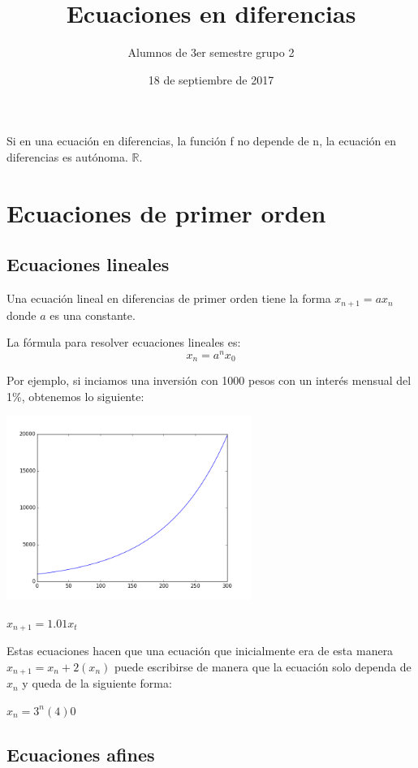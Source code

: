 \documentclass{article}
\title{Ecuaciones en diferencias}
\author{Alumnos de 3er semestre grupo 2}
\date{18 de septiembre de 2017}
\begin{document}
\maketitle

Si en una ecuación en diferencias, la función f no depende de n, la ecuación en diferencias es autónoma. $\mathbb{R}$.

\section{Ecuaciones de primer orden}

\subsection{Ecuaciones lineales}

Una ecuación lineal en diferencias de primer orden tiene la forma $x_{n+1}=ax_n$ donde $a$ es una constante. 

La fórmula para resolver ecuaciones lineales es:
\begin{equation}
  \label{lineal}
  x_n=a^nx_0
\end{equation}

Por ejemplo, si inciamos una inversión con 1000 pesos con un interés mensual del 1\%, obtenemos lo siguiente:

\begin{center}
  \includegraphics[width=8cm]{inversion.png}
\end{center}


$x_{n+1}=1.01x_t$

Estas ecuaciones hacen que una ecuación que inicialmente era de esta manera $x_{n+1}=x_n+2(x_n)$ puede escribirse de manera que la ecuación solo dependa de $x_n$ y queda de la siguiente forma:

$x_n=3^n(4)$0     


\subsection{Ecuaciones afines}
\end{document}
